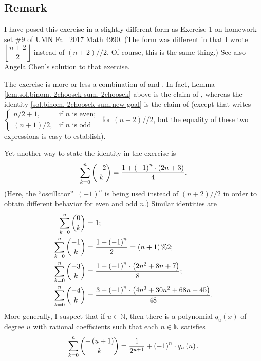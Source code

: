 \documentclass[paper=a4, fontsize=12pt]{scrartcl}%
\let\sumnonlimits\sum
\renewcommand{\sum}{\sumnonlimits\limits}
\theoremstyle{plainsl}
\theoremstyle{definition}
\theoremstyle{remark}
\begin{document}
\subsection{Remark}

I have posed this exercise in a slightly different form as Exercise 1 on
homework set \#9 of
\href{http://www.cip.ifi.lmu.de/~grinberg/t/17f/index.html}{UMN Fall 2017 Math
4990}. (The form was different in that I wrote $\left\lfloor \dfrac{n+2}%
{2}\right\rfloor $ instead of $\left(  n+2\right)  //2$. Of course, this is
the same thing.) See also
\href{http://www.cip.ifi.lmu.de/~grinberg/t/17f/hw9os-chen.pdf}{Angela Chen's
solution} to that exercise.

The exercise is more or less a combination of \cite[Exercise 2.9]{detnotes}
and \cite[Exercise 3.5 \textbf{(b)}]{detnotes}. In fact, Lemma
\ref{lem.sol.binom.-2choosek-sum.-2choosek} above is the claim of
\cite[Exercise 3.5 \textbf{(b)}]{detnotes}, whereas the identity
\eqref{sol.binom.-2choosek-sum.new-goal} is the claim of \cite[Exercise
2.9]{detnotes} (except that \cite[Exercise 2.9]{detnotes} writes $%
\begin{cases}
n/2+1, & \text{if }n\text{ is even};\\
\left(  n+1\right)  /2, & \text{if }n\text{ is odd}%
\end{cases}
$ for $\left(  n+2\right)  //2$, but the equality of these two expressions is
easy to establish).

Yet another way to state the identity in the exercise is%
\[
\sum_{k=0}^{n}\dbinom{-2}{k}=\dfrac{1+\left(  -1\right)  ^{n}\cdot\left(
2n+3\right)  }{4}.
\]
(Here, the \textquotedblleft oscillator\textquotedblright\ $\left(  -1\right)
^{n}$ is being used instead of $\left(  n+2\right)  //2$ in order to obtain
different behavior for even and odd $n$.) Similar identities are%
\begin{align*}
\sum_{k=0}^{n}\dbinom{0}{k}  &  =1;\\
\sum_{k=0}^{n}\dbinom{-1}{k}  &  =\dfrac{1+\left(  -1\right)  ^{n}}{2}=\left(
n+1\right)  \%2;\\
\sum_{k=0}^{n}\dbinom{-3}{k}  &  =\dfrac{1+\left(  -1\right)  ^{n}\cdot\left(
2n^{2}+8n+7\right)  }{8};\\
\sum_{k=0}^{n}\dbinom{-4}{k}  &  =\dfrac{3+\left(  -1\right)  ^{n}\cdot\left(
4n^{3}+30n^{2}+68n+45\right)  }{48}.
\end{align*}
More generally, I suspect that if $u\in\mathbb{N}$, then there is a polynomial
$q_{u}\left(  x\right)  $ of degree $u$ with rational coefficients such that
each $n\in\mathbb{N}$ satisfies%
\[
\sum_{k=0}^{n}\dbinom{-\left(  u+1\right)  }{k}=\dfrac{1}{2^{u+1}}+\left(
-1\right)  ^{n}\cdot q_{u}\left(  n\right)  .
\]
\end{document}
